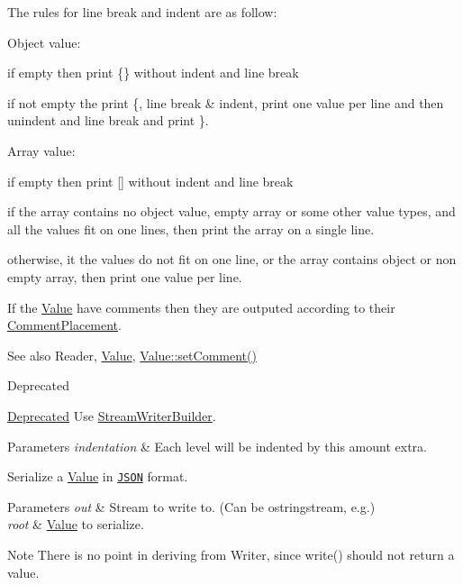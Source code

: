 The rules for line break and indent are as follow\+:
\begin{DoxyItemize}
\item Object value\+:
\begin{DoxyItemize}
\item if empty then print \{\} without indent and line break
\item if not empty the print \textquotesingle{}\{\textquotesingle{}, line break \& indent, print one value per line and then unindent and line break and print \textquotesingle{}\}\textquotesingle{}.
\end{DoxyItemize}
\item Array value\+:
\begin{DoxyItemize}
\item if empty then print \mbox{[}\mbox{]} without indent and line break
\item if the array contains no object value, empty array or some other value types, and all the values fit on one lines, then print the array on a single line.
\item otherwise, it the values do not fit on one line, or the array contains object or non empty array, then print one value per line.
\end{DoxyItemize}
\end{DoxyItemize}

If the \hyperlink{classJson_1_1Value}{Value} have comments then they are outputed according to their \hyperlink{namespaceJson_a4fc417c23905b2ae9e2c47d197a45351_a4fc417c23905b2ae9e2c47d197a45351}{Comment\+Placement}.

\begin{DoxySeeAlso}{See also}
Reader, \hyperlink{classJson_1_1Value}{Value}, \hyperlink{classJson_1_1Value_a29f3a30f7e5d3af6f38d57999bf5b480_a29f3a30f7e5d3af6f38d57999bf5b480}{Value\+::set\+Comment()} 
\end{DoxySeeAlso}
\begin{DoxyRefDesc}{Deprecated}
\item[\hyperlink{deprecated__deprecated000010}{Deprecated}]Use \hyperlink{classJson_1_1StreamWriterBuilder}{Stream\+Writer\+Builder}. \end{DoxyRefDesc}

\begin{DoxyParams}{Parameters}
{\em indentation} & Each level will be indented by this amount extra.\\
\hline
\end{DoxyParams}
Serialize a \hyperlink{classJson_1_1Value}{Value} in \href{http://www.json.org}{\tt J\+S\+ON} format. 
\begin{DoxyParams}{Parameters}
{\em out} & Stream to write to. (Can be ostringstream, e.\+g.) \\
\hline
{\em root} & \hyperlink{classJson_1_1Value}{Value} to serialize. \\
\hline
\end{DoxyParams}
\begin{DoxyNote}{Note}
There is no point in deriving from Writer, since write() should not return a value.
\end{DoxyNote}


